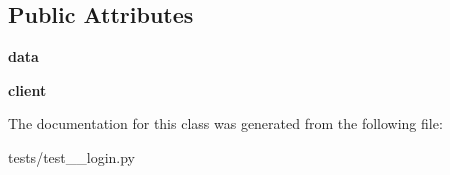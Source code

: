 \subsection*{Public Attributes}
\begin{DoxyCompactItemize}
\item 
\mbox{\label{classtests_1_1test__4__login_1_1_test_user_routes_a652a95b2a2b52dcd16a9d5afa1d7eab2}} 
{\bfseries data}
\item 
\mbox{\label{classtests_1_1test__4__login_1_1_test_user_routes_a4d82ff8c534405f1612d17395bec50d3}} 
{\bfseries client}
\end{DoxyCompactItemize}


The documentation for this class was generated from the following file\+:\begin{DoxyCompactItemize}
\item 
tests/test\+\_\+\_\+login.\+py\end{DoxyCompactItemize}
